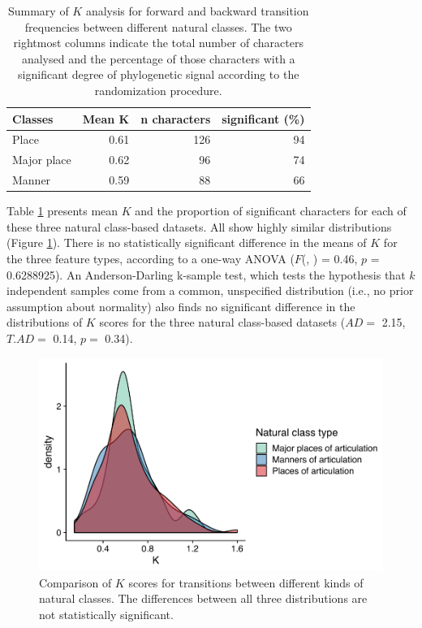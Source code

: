 \begin{table}

\caption{\label{tab:k-natural-classes-summary}Summary of $K$ analysis for forward and backward transition frequencies between different natural classes. The two rightmost columns indicate the total number of characters analysed and the percentage of those characters with a significant degree of phylogenetic signal according to the randomization procedure.}
\centering
\begin{tabular}[t]{lrrr}
\toprule
Classes & Mean K & n characters & significant (\%)\\
\midrule
Place & 0.61 & 126 & 94\\
Major place & 0.62 & 96 & 74\\
Manner & 0.59 & 88 & 66\\
\bottomrule
\end{tabular}
\end{table}

Table \ref{tab:k-natural-classes-summary} presents mean \(K\) and the proportion of significant characters for each of these three natural class-based datasets. All show highly similar distributions (Figure \ref{fig:k-natural-classes}). There is no statistically significant difference in the means of \(K\) for the three feature types, according to a one-way ANOVA (\(F\)(, ) = 0.46, \(p\) = 0.6288925). An Anderson-Darling k-sample test, which tests the hypothesis that \(k\) independent samples come from a common, unspecified distribution (i.e., no prior assumption about normality) also finds no significant difference in the distributions of \(K\) scores for the three natural class-based datasets (\(AD=\) 2.15, \(T.AD=\) 0.14, \(p=\) 0.34).

\begin{figure}

{\centering \includegraphics[width=0.66\linewidth]{fig/k-natural-classes} 

}

\caption{Comparison of $K$ scores for transitions between different kinds of natural classes. The differences between all three distributions are not statistically significant.}\label{fig:k-natural-classes}
\end{figure}

